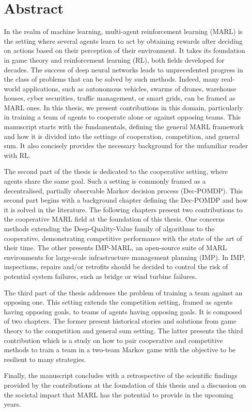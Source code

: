 
\chapter*{Abstract}

In the realm of machine learning, multi-agent reinforcement learning (MARL) is the setting where several agents learn to act by obtaining rewards after deciding on actions based on their perception of their environment.
It takes its foundation in game theory and reinforcement learning (RL), both fields developed for decades.
The success of deep neural networks leads to unprecedented progress in the class of problems that can be solved by such methods.
Indeed, many real-world applications, such as autonomous vehicles, swarms of drones, warehouse houses, cyber securities, traffic management, or smart grids, can be framed as MARL ones.
In this thesis, we present contributions in this domain, particularly in training a team of agents to cooperate alone or against opposing teams.
This manuscript starts with the fundamentals, defining the general MARL framework and how it is divided into the settings of cooperation, competition, and general sum.
It also concisely provides the necessary background for the unfamiliar reader with RL.

The second part of the thesis is dedicated to the cooperative setting, where agents share the same goal.
Such a setting is commonly framed as a decentralised, partially observable Markov decision process (Dec-POMDP).
This second part begins with a background chapter defining the Dec-POMDP and how it is solved in the literature.
The following chapters present two contributions to the cooperative MARL field at the foundation of this thesis.
One concerns methods extending the Deep-Quality-Value family of algorithms to the cooperative, demonstrating competitive performance with the state of the art of their time.
The other presents IMP-MARL, an open-source suite of MARL environments for large-scale infrastructure management planning (IMP).
In IMP, inspections, repairs and/or retrofits should be decided to control the risk of potential system failures, such as bridge or wind turbine failures.

The third part of the thesis addresses the problem of training a team against an opposing one.
This setting extends the competition setting, framed as agents having opposing goals, to teams of agents having opposing goals.
It is composed of two chapters.
The former present historical stories and solutions from game theory to the competition and general sum setting.
The latter presents the third contribution which is a study on how to pair cooperative and competitive methods to train a team in a two-team Markov game with the objective to be resilient to many strategies.

Finally, the manuscript concludes with a retrospective of the scientific findings provided by the contributions at the foundation of this thesis and a discussion on the societal impact that MARL has the potential to provide in the upcoming years.

